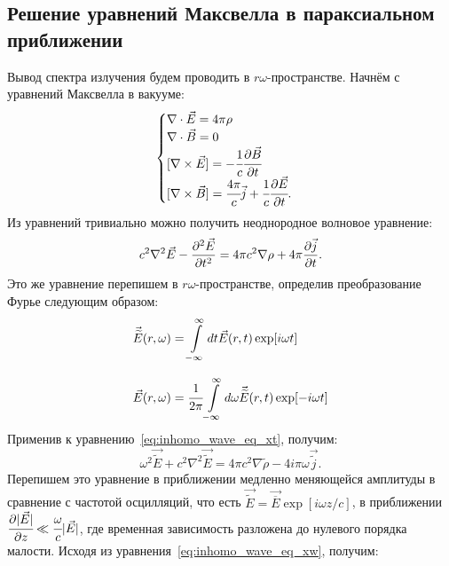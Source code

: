 \subsection{Решение уравнений Максвелла в параксиальном приближении}
Вывод спектра излучения будем проводить в $r\omega$-пространстве. Начнём с уравнений Максвелла в вакууме:
\begin{equation}
	\begin{cases}
		\nabla \cdot \vec{E} = 4\pi \rho\\
		\nabla \cdot \vec{B} = 0\\
		[\nabla \times \vec{E}] = -\cfrac{1}{c} \cfrac{\partial\vec{B}}{\partial t}\\
		[\nabla \times \vec{B}] = \cfrac{4\pi}{c} \vec{j} + \cfrac{1}{c} \cfrac{\partial\vec{E}}{\partial t}.
	\end{cases} 
\end{equation}
Из уравнений тривиально можно получить неоднородное волновое уравнение: 
\begin{equation}
	\label{eq:inhomo_wave_eq_xt}
	c^2 \nabla^2 \vec{E} - \pdv[2]{\vec{E}}{t} = 4\pi c^2 \nabla \rho + 4\pi \pdv{\vec{j}}{t}.
\end{equation}
Это же уравнение перепишем в $r\omega$-пространстве, определив преобразование Фурье следующим образом:
\begin{equation}
	\label{eq:Fourier_wt}
	\begin{array}{lcl}
		\vec{\widetilde{E}}(r, \omega) = \displaystyle\int\limits_{-\infty}^{\infty} dt \vec{E}(r, t)\exp[i\omega t]\\
		\\
		\vec{E}(r, \omega) = \cfrac{1}{2\pi}\displaystyle\int\limits_{-\infty}^{\infty} d\omega \vec{\widetilde{E}}(r, t)\exp[-i\omega t]
	\end{array}
\end{equation}
Применив к уравнению~\ref{eq:inhomo_wave_eq_xt}, получим:
\begin{equation}
	\label{eq:inhomo_wave_eq_xw}
	\omega^2 \vec{\widetilde{E}} + c^2 \nabla^2 \vec{\widetilde{E}} = 4\pi c^2 \nabla  \widetilde{\rho} - 4i\pi\omega\vec{\widetilde{j}}.
\end{equation}
Перепишем это уравнение в приближении медленно меняющейся амплитуды в сравнение с частотой осцилляций, что есть $\vec{\widetilde{E}} =  \vec{\overline{E}}\exp[i\omega z/c]$, в приближении $\cfrac{\partial |\vec{E}|}{\partial z} \ll \cfrac{\omega}{c}|\vec{E}|$, где временная зависимость разложена до нулевого порядка малости. Исходя из уравнения~\ref{eq:inhomo_wave_eq_xw}, получим:
